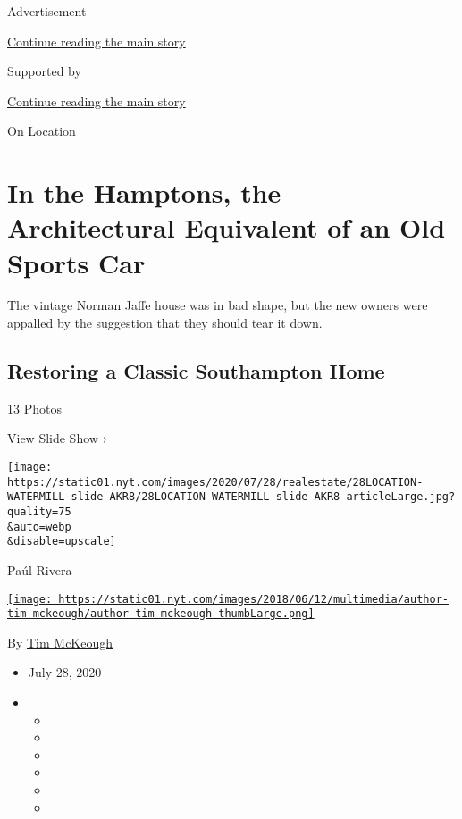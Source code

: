Advertisement

\protect\hyperlink{after-top}{Continue reading the main story}

Supported by

\protect\hyperlink{after-sponsor}{Continue reading the main story}

On Location

\hypertarget{in-the-hamptons-the-architectural-equivalent-of-an-old-sports-car}{%
\section{In the Hamptons, the Architectural Equivalent of an Old Sports
Car}\label{in-the-hamptons-the-architectural-equivalent-of-an-old-sports-car}}

The vintage Norman Jaffe house was in bad shape, but the new owners were
appalled by the suggestion that they should tear it down.

\href{https://www.nytimes.com/slideshow/2020/07/28/realestate/restoring-a-classic-southampton-home.html}{}

\hypertarget{restoring-a-classic-southampton-home}{%
\subsection{Restoring a Classic Southampton
Home}\label{restoring-a-classic-southampton-home}}

13 Photos

View Slide Show ›

\texttt{[image: https://static01.nyt.com/images/2020/07/28/realestate/28LOCATION-WATERMILL-slide-AKR8/28LOCATION-WATERMILL-slide-AKR8-articleLarge.jpg?quality=75\\\&auto=webp\\\&disable=upscale]}

Paúl Rivera

\href{https://www.nytimes.com/by/tim-mckeough}{\texttt{[image: https://static01.nyt.com/images/2018/06/12/multimedia/author-tim-mckeough/author-tim-mckeough-thumbLarge.png]}}

By \href{https://www.nytimes.com/by/tim-mckeough}{Tim McKeough}

\begin{itemize}
\item
  July 28, 2020
\item
  \begin{itemize}
  \item
  \item
  \item
  \item
  \item
  \item
  \end{itemize}
\end{itemize}

